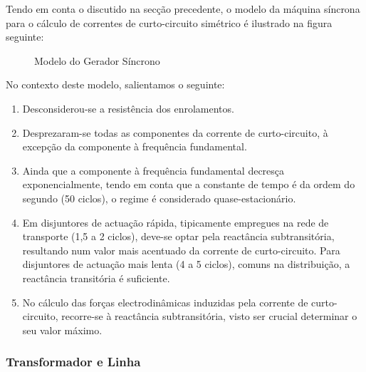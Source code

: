 Tendo em conta o discutido na secção precedente, o modelo da máquina síncrona para o cálculo de correntes de curto-circuito simétrico é ilustrado na figura seguinte:

\begin{figure}[H]
    \centering
    \caption{Modelo do Gerador Síncrono}
    \label{fig:modelo-gerador-sincrono}
\end{figure}

\noindent No contexto deste modelo, salientamos o seguinte:
\begin{enumerate}
    \item Desconsiderou-se a resistência dos enrolamentos.
    \item Desprezaram-se todas as componentes da corrente de curto-circuito, à excepção da componente à frequência fundamental.
    \item Ainda que a componente à frequência fundamental decresça exponencialmente, tendo em conta que a constante de tempo é da ordem do segundo (50 ciclos), o regime é considerado quase-estacionário.
    \item Em disjuntores de actuação rápida, tipicamente empregues na rede de transporte (1,5 a 2 ciclos), deve-se optar pela reactância subtransitória, resultando num valor mais acentuado da corrente de curto-circuito. Para disjuntores de actuação mais lenta (4 a 5 ciclos), comuns na distribuição, a reactância transitória é suficiente.
    \item No cálculo das forças electrodinâmicas induzidas pela corrente de curto-circuito, recorre-se à reactância subtransitória, visto ser crucial determinar o seu valor máximo.
\end{enumerate}

\subsubsection{Transformador e Linha}

